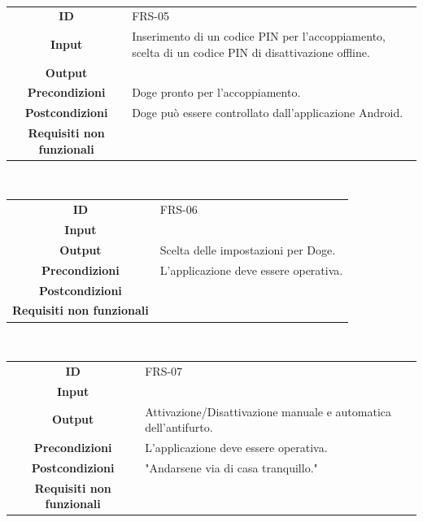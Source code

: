 \documentclass{article}
\begin{document}
    ~
    
    \begin{adjustbox}{center}
    \begin{tabular}{|c|p{10cm}|}
    \hline
    \textbf{ID} & FRS-05 \\
    \textbf{Input} & Inserimento di un codice PIN per l'accoppiamento, scelta di un codice PIN di disattivazione offline. \\
    \textbf{Output} &  \\
    \textbf{Precondizioni} & Doge pronto per l'accoppiamento. \\
    \textbf{Postcondizioni} & Doge può essere controllato dall'applicazione Android. \\
    \textbf{Requisiti non funzionali} &  \\
    \hline
    \end{tabular}
    \end{adjustbox}
    
    ~
    
    \begin{adjustbox}{center}
    \begin{tabular}{|c|p{10cm}|}
    \hline
    \textbf{ID} & FRS-06\\
    \textbf{Input} &\\
    \textbf{Output} & Scelta delle impostazioni per Doge.\\
    \textbf{Precondizioni} & L'applicazione deve essere operativa.\\
    \textbf{Postcondizioni} &\\
    \textbf{Requisiti non funzionali} &\\
    \hline
    \end{tabular}
    \end{adjustbox}
    
    ~
    
    \begin{adjustbox}{center}
    \begin{tabular}{|c|p{10cm}|}
    \hline
    \textbf{ID} & FRS-07\\
    \textbf{Input} &\\
    \textbf{Output} & Attivazione/Disattivazione manuale e automatica dell'antifurto.\\
    \textbf{Precondizioni} & L'applicazione deve essere operativa.\\
    \textbf{Postcondizioni} & "Andarsene via di casa tranquillo."\\
    \textbf{Requisiti non funzionali} &\\
    \hline
    \end{tabular}
    \end{adjustbox}
    
\end{document}
